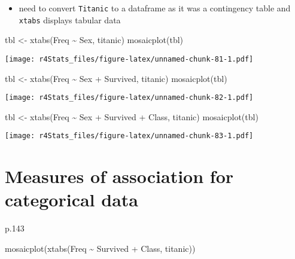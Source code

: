 \documentclass[
]{book}
\newenvironment{Shaded}{\begin{snugshade}}{\end{snugshade}}
\newcommand{\FunctionTok}[1]{\textcolor[rgb]{0.00,0.00,0.00}{#1}}
\newcommand{\NormalTok}[1]{#1}
\newcommand{\OtherTok}[1]{\textcolor[rgb]{0.56,0.35,0.01}{#1}}
\newcommand{\SpecialCharTok}[1]{\textcolor[rgb]{0.00,0.00,0.00}{#1}}
\providecommand{\tightlist}{%
  \setlength{\itemsep}{0pt}\setlength{\parskip}{0pt}}
\theoremstyle{definition}
\theoremstyle{definition}
\theoremstyle{definition}
\theoremstyle{definition}
\theoremstyle{remark}
\begin{document}
\begin{itemize}
\tightlist
\item
  need to convert \texttt{Titanic} to a dataframe as it was a contingency table and \texttt{xtabs} displays tabular data
\end{itemize}

\begin{Shaded}
\begin{Highlighting}[]
\NormalTok{tbl }\OtherTok{\textless{}{-}} \FunctionTok{xtabs}\NormalTok{(Freq }\SpecialCharTok{\textasciitilde{}}\NormalTok{ Sex, titanic)}
\FunctionTok{mosaicplot}\NormalTok{(tbl)}
\end{Highlighting}
\end{Shaded}

\texttt{[image: r4Stats\_files/figure-latex/unnamed-chunk-81-1.pdf]}

\begin{Shaded}
\begin{Highlighting}[]
\NormalTok{tbl }\OtherTok{\textless{}{-}} \FunctionTok{xtabs}\NormalTok{(Freq }\SpecialCharTok{\textasciitilde{}}\NormalTok{ Sex }\SpecialCharTok{+}\NormalTok{ Survived, titanic)}
\FunctionTok{mosaicplot}\NormalTok{(tbl)}
\end{Highlighting}
\end{Shaded}

\texttt{[image: r4Stats\_files/figure-latex/unnamed-chunk-82-1.pdf]}

\begin{Shaded}
\begin{Highlighting}[]
\NormalTok{tbl }\OtherTok{\textless{}{-}} \FunctionTok{xtabs}\NormalTok{(Freq }\SpecialCharTok{\textasciitilde{}}\NormalTok{ Sex }\SpecialCharTok{+}\NormalTok{ Survived }\SpecialCharTok{+}\NormalTok{ Class, titanic)}
\FunctionTok{mosaicplot}\NormalTok{(tbl)}
\end{Highlighting}
\end{Shaded}

\texttt{[image: r4Stats\_files/figure-latex/unnamed-chunk-83-1.pdf]}

\hypertarget{measures-of-association-for-categorical-data}{%
\section{Measures of association for categorical data}\label{measures-of-association-for-categorical-data}}

p.143

\begin{Shaded}
\begin{Highlighting}[]
\FunctionTok{mosaicplot}\NormalTok{(}\FunctionTok{xtabs}\NormalTok{(Freq }\SpecialCharTok{\textasciitilde{}}\NormalTok{ Survived }\SpecialCharTok{+}\NormalTok{ Class, titanic))}
\end{Highlighting}
\end{Shaded}
\end{document}
